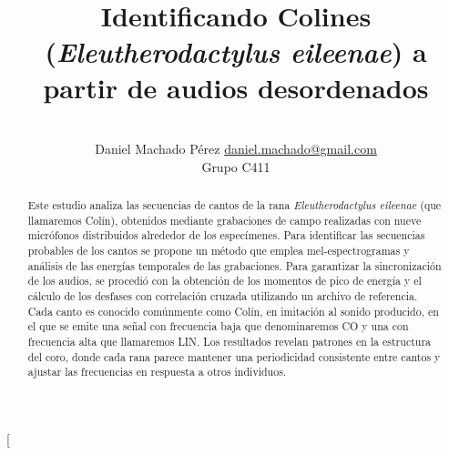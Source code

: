 \documentclass[a4paper,10pt,twocolumn]{article}
\title{Identificando Colines (\textit{Eleutherodactylus eileenae}) a partir de audios desordenados}
\author{\\
\name Daniel Machado Pérez \email \href{mailto:daniel.machado@gmail.com}{daniel.machado@gmail.com}
	\\ \addr Grupo C411}
\begin{document}
\twocolumn[

\maketitle


\begin{abstract}


Este estudio analiza las secuencias de cantos de la 
rana \textit{Eleutherodactylus eileenae} (que llamaremos Colín), 
obtenidos mediante grabaciones de campo realizadas 
con nueve micrófonos distribuidos alrededor de los 
especímenes. Para identificar las secuencias 
probables de los cantos se propone un método que 
emplea mel-espectrogramas y análisis de las energías 
temporales de las grabaciones. Para garantizar la sincronización de 
los audios, se procedió con la obtención de
los momentos de pico de energía y el cálculo de los 
desfases con correlación cruzada utilizando un 
archivo de referencia. Cada canto es conocido comúnmente como
Colín, en imitación al sonido producido, en el que se emite
una señal con frecuencia baja que denominaremos CO y una con frecuencia
alta que llamaremos LIN. Los resultados 
revelan patrones en la estructura del coro, donde 
cada rana parece mantener una periodicidad consistente 
entre cantos y ajustar las frecuencias en respuesta a 
otros individuos.
	
	

\end{abstract}

\vspace{0.5cm}
\end{document}
